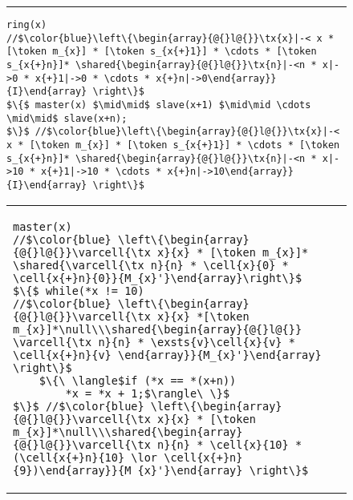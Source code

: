 %
\begin{figure}
\centering
\noindent\hrule\vspace{10pt}
\vspace{-3ex}
{\begin{lstlisting}[numbers=none,numbersep=5pt]
ring(x)
//$\color{blue}\left\{\begin{array}{@{}l@{}}\tx{x}|-< x * [\token m_{x}] * [\token s_{x{+}1}] * \cdots * [\token s_{x{+}n}]* \shared{\begin{array}{@{}l@{}}\tx{n}|-<n * x|->0 * x{+}1|->0 * \cdots * x{+}n|->0\end{array}}{I}\end{array} \right\}$
$\{$ master(x) $\mid\mid$ slave(x+1) $\mid\mid \cdots \mid\mid$ slave(x+n);
$\}$ //$\color{blue}\left\{\begin{array}{@{}l@{}}\tx{x}|-< x * [\token m_{x}] * [\token s_{x{+}1}] * \cdots * [\token s_{x{+}n}]* \shared{\begin{array}{@{}l@{}}\tx{n}|-<n * x|->10 * x{+}1|->10 * \cdots * x{+}n|->10\end{array}}{I}\end{array} \right\}$
\end{lstlisting}}
%
\begin{tabular}{@{} l @{\hspace{2ex}} l@{}}
{\begin{lstlisting}
master(x)
//$\color{blue} \left\{\begin{array}{@{}l@{}}\varcell{\tx x}{x} * [\token m_{x}]* \shared{\varcell{\tx n}{n} * \cell{x}{0} * \cell{x{+}n}{0}}{M_{x}'}\end{array}\right\}$
$\{$ while(*x != 10)
//$\color{blue} \left\{\begin{array}{@{}l@{}}\varcell{\tx x}{x} *[\token m_{x}]*\null\\\shared{\begin{array}{@{}l@{}} \varcell{\tx n}{n} * \exsts{v}\cell{x}{v} * \cell{x{+}n}{v} \end{array}}{M_{x}'}\end{array} \right\}$
    $\{\ \langle$if (*x == *(x+n))
        *x = *x + 1;$\rangle\ \}$
$\}$ //$\color{blue} \left\{\begin{array}{@{}l@{}}\varcell{\tx x}{x} * [\token m_{x}]*\null\\\shared{\begin{array}{@{}l@{}}\varcell{\tx n}{n} * \cell{x}{10} * (\cell{x{+}n}{10} \lor \cell{x{+}n}{9})\end{array}}{M_{x}'}\end{array} \right\}$

\end{lstlisting}}
\end{tabular}
\end{figure}
